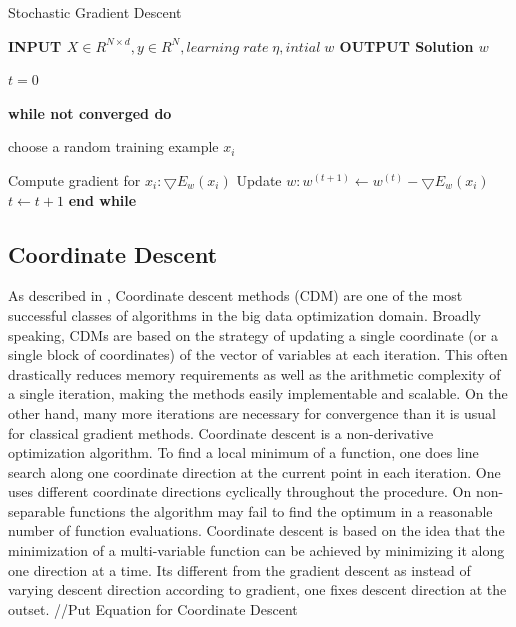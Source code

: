 \documentclass{sigplanconf}
\newlength\myindent
\newcommand\bindent{%
  \begingroup
  \setlength{\itemindent}{\myindent}
  \addtolength{\algorithmicindent}{\myindent}
}
\newcommand\eindent{\endgroup}
\begin{document}
\begin{algorithm}
\caption{Stochastic Gradient Descent}
\begin{algorithmic} 

\STATE \bf{INPUT} \begin{math} X \in {R}^{N \times  d}, y \in R^N, learning\;  rate\;  \eta, intial\; w \end{math} 
\STATE \bf{OUTPUT} \textnormal{Solution} \begin{math}  w \end{math} 

	\STATE \textnormal{\begin{math} t = 0\end{math} }

	\STATE \bf{while} \textnormal{not converged} \bf{do}
    	\bindent
	 \STATE \textnormal{\indent choose a random training example \begin{math}x_i\end{math}}

	 \STATE \textnormal{\indent Compute gradient for \begin{math}x_i: \bigtriangledown{E_w(x_i)}\end{math}}
	 \STATE \textnormal{\indent Update \begin{math}w: w^{(t+1)} \gets w^{(t)} - \bigtriangledown{E_w(x_i)}\end{math}}
	 \STATE \textnormal{\indent \begin{math}t \gets t + 1\end{math}}
	    \eindent
	\STATE \bf{end while}

\end{algorithmic}
\end{algorithm}

\subsection{Coordinate Descent}
As described in \cite{fried1}, Coordinate descent methods (CDM) are one of the most successful classes of algorithms in the big data optimization domain. 
Broadly speaking, CDMs are based on the strategy of updating a single coordinate (or a single block of coordinates) of the vector
of variables at each iteration. This often drastically reduces memory requirements as well as the
arithmetic complexity of a single iteration, making the methods easily implementable and scalable.
On the other hand, many more iterations are necessary for convergence than it is usual for classical gradient methods.
Coordinate descent is a non-derivative optimization algorithm. To find a local minimum of a function, one does line 
search along one coordinate direction at the current point in each iteration. One uses different coordinate directions 
cyclically throughout the procedure. On non-separable functions the algorithm may fail to find the optimum in a reasonable 
number of function evaluations. 
Coordinate descent is based on the idea that the minimization of a multi-variable function can be
achieved by minimizing it along one direction at a time. Its different from the gradient descent as instead of varying descent direction according
to gradient, one fixes descent direction at the outset.
//Put Equation for Coordinate Descent
\end{document}
